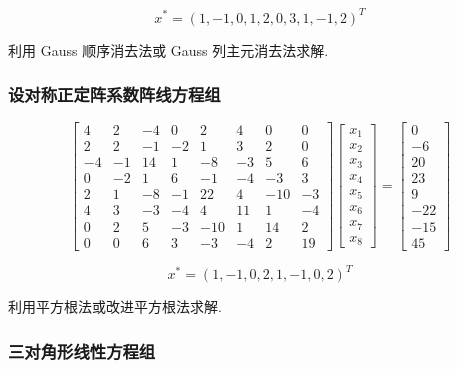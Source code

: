 \[x^* = (1, -1, 0, 1, 2, 0, 3, 1, -1, 2) ^ T\]

利用 Gauss 顺序消去法或 Gauss 列主元消去法求解.

\subsubsection{设对称正定阵系数阵线方程组}



\[
    \begin{bmatrix}
        4  & 2  & -4 & 0  & 2   & 4  & 0   & 0  \\
        2  & 2  & -1 & -2 & 1   & 3  & 2   & 0  \\
        -4 & -1 & 14 & 1  & -8  & -3 & 5   & 6  \\
        0  & -2 & 1  & 6  & -1  & -4 & -3  & 3  \\
        2  & 1  & -8 & -1 & 22  & 4  & -10 & -3 \\
        4  & 3  & -3 & -4 & 4   & 11 & 1   & -4 \\
        0  & 2  & 5  & -3 & -10 & 1  & 14  & 2  \\
        0  & 0  & 6  & 3  & -3  & -4 & 2   & 19
    \end{bmatrix}
    \begin{bmatrix}
        x_1 \\
        x_2 \\
        x_3 \\
        x_4 \\
        x_5 \\
        x_6 \\
        x_7 \\
        x_8
    \end{bmatrix}
    =
    \begin{bmatrix}
        0   \\
        -6  \\
        20  \\
        23  \\
        9   \\
        -22 \\
        -15 \\
        45
    \end{bmatrix}
\]

\[
    x^* = (1, -1, 0, 2, 1, -1, 0, 2)^T
\]

利用平方根法或改进平方根法求解.

\subsubsection{三对角形线性方程组}




